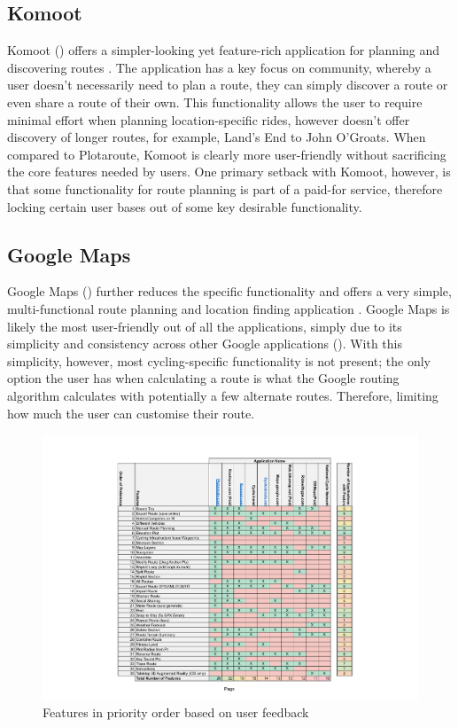 \subsection{Komoot}
\label{litrev:komoot}
Komoot (\cite{noauthor_komoot_nodate}) offers a simpler-looking yet feature-rich application for planning and discovering routes . The application has a key focus on community, whereby a user doesn't necessarily need to plan a route, they can simply discover a route or even share a route of their own. This functionality allows the user to require minimal effort when planning location-specific rides, however doesn't offer discovery of longer routes, for example, Land's End to John O'Groats. When compared to Plotaroute, Komoot is clearly more user-friendly without sacrificing the core features needed by users. One primary setback with Komoot, however, is that some functionality for route planning is part of a paid-for service, therefore locking certain user bases out of some key desirable functionality.

\subsection{Google Maps}
\label{litrev:gmaps}

Google Maps (\cite{noauthor_google_nodate}) further reduces the specific functionality and offers a very simple, multi-functional route planning and location finding application . Google Maps is likely the most user-friendly out of all the applications, simply due to its simplicity and consistency across other Google applications (\cite{noauthor_material_nodate}). With this simplicity, however, most cycling-specific functionality is not present; the only option the user has when calculating a route is what the Google routing algorithm calculates with potentially a few alternate routes. Therefore, limiting how much the user can customise their route.

\begin{figure}[h!]
    \centering
    \includegraphics[width=1\linewidth]{figures/current_apps_post_research.pdf}
    \caption{Features in priority order based on user feedback}
    \label{fig:features}
\end{figure}

